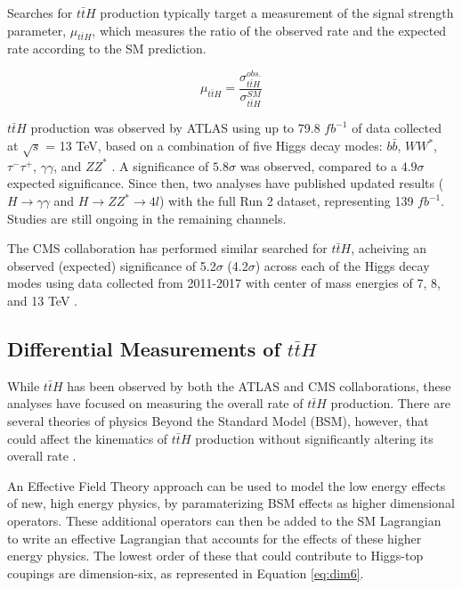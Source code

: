 Searches for $t\bar{t}H$ production typically target a measurement of the signal strength parameter, $\mu_{t\bar{t}H}$, which measures the ratio of the observed rate and the expected rate according to the SM prediction.

\begin{equation}
        \mu_{t\bar{t}H} = \frac{\sigma^{obs.}_{t\bar{t}H}}{\sigma^{SM}_{t\bar{t}H}}
\end{equation}

$t\bar{t}H$ production was observed by ATLAS using up to 79.8 $fb^{-1}$ of data collected at $\sqrt{s}$ = 13 TeV, based on a combination of five Higgs decay modes: $b\bar{b}$, $WW^*$, $\tau^{-}\tau^{+}$, $\gamma\gamma$, and $ZZ^*$ \cite{Higgs_combo}. A significance of $5.8\sigma$ was observed, compared to a $4.9\sigma$ expected significance. Since then, two analyses have published updated results ($H\rightarrow \gamma\gamma$ and $H\rightarrow ZZ^*\rightarrow 4l$) with the full Run 2 dataset, representing 139 $fb^{-1}$. Studies are still ongoing in the remaining channels.

The CMS collaboration has performed similar searched for $t\bar{t}H$, acheiving an observed (expected) significance of 5.2$\sigma$ (4.2$\sigma$) across each of the Higgs decay modes using data collected from 2011-2017 with center of mass energies of 7, 8, and 13 TeV \cite{PhysRevLett.120.231801}. 


\subsection{Differential Measurements of $t\bar{t}H$}
\label{sec:bsm}

While $t\bar{t}H$ has been observed by both the ATLAS \cite{ttH_paper} and CMS \cite{Sirunyan_2018} collaborations, these analyses have focused on measuring the overall rate of $t\bar{t}H$ production. There are several theories of physics Beyond the Standard Model (BSM), however, that could affect the kinematics of $t\bar{t}H$ production without significantly altering its overall rate \cite{Dumont_2013}.

An Effective Field Theory approach can be used to model the low energy effects of new, high energy physics, by paramaterizing BSM effects as higher dimensional operators. These additional operators can then be added to the SM Lagrangian to write an effective Lagrangian that accounts for the effects of these higher energy physics. The lowest order of these that could contribute to Higgs-top coupings are dimension-six, as represented in Equation \ref{eq:dim6}.

